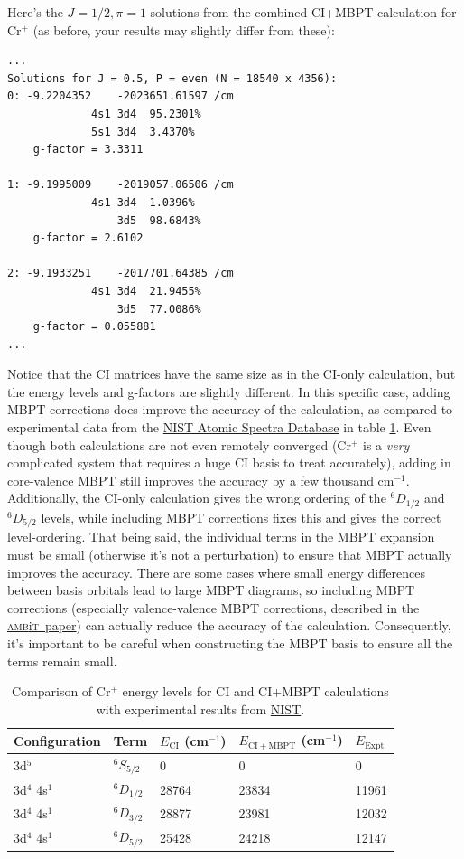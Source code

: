 \documentclass{report}
\newcommand{\ambit}{\textsc{amb}{\footnotesize i}\textsc{t}}
\begin{document}
Here's the $J = 1/2, \pi = 1$ solutions from the combined CI+MBPT calculation for Cr$^+$ (as before, 
your results may slightly differ from these):

\begin{verbatim}
...
Solutions for J = 0.5, P = even (N = 18540 x 4356):
0: -9.2204352    -2023651.61597 /cm
             4s1 3d4  95.2301%
             5s1 3d4  3.4370%
    g-factor = 3.3311

1: -9.1995009    -2019057.06506 /cm
             4s1 3d4  1.0396%
                 3d5  98.6843%
    g-factor = 2.6102

2: -9.1933251    -2017701.64385 /cm
             4s1 3d4  21.9455%
                 3d5  77.0086%
    g-factor = 0.055881
...
\end{verbatim}

Notice that the CI matrices have the same size as in the CI-only calculation, but the energy levels and
g-factors are slightly different. In this specific case, adding MBPT corrections does improve the
accuracy of the calculation, as compared to experimental data from the 
\href{https://physics.nist.gov/PhysRefData/ASD/levels_form.html}{NIST Atomic Spectra Database} in table
\ref{tab:CI_MBPT_comparison}. Even though both calculations are not even remotely converged (Cr$^+$ is a
\emph{very} complicated system that requires a huge CI basis to treat accurately), adding in
core-valence MBPT still improves the accuracy by a few thousand cm$^{-1}$. Additionally,
the CI-only calculation gives the wrong ordering of the $^6D_{1/2}$ and $^6D_{5/2}$
levels, while including MBPT corrections fixes this and gives the correct level-ordering. That being
said, the individual terms in the MBPT expansion must be small (otherwise it's not a perturbation) to
ensure that MBPT actually improves the accuracy. There are some cases where small energy differences
between basis orbitals lead to large MBPT diagrams, so including MBPT corrections (especially
valence-valence MBPT corrections, described in the \href{https://arxiv.org/abs/1805.11265}
{\ambit\ paper}) can
actually reduce the accuracy of the calculation. Consequently, it's important to be careful when 
constructing the MBPT basis to ensure all the terms remain small.

\begin{table}
\label{tab:CI_MBPT_comparison}
\caption{Comparison of Cr$^+$ energy levels for CI and CI+MBPT calculations with experimental results
from \href{https://physics.nist.gov/PhysRefData/ASD/levels_form.html}{NIST}.}
\begin{tabular}{l  l  l  l  l}
\hline
Configuration   &Term    &$E_{\mathrm{CI}}$ (cm$^{-1}$)     &$E_{\mathrm{CI+MBPT}}$ (cm$^{-1}$)  & $E_{\mathrm{Expt}}$\\
\hline
\hline
3d$^5$  &$^6S_{5/2}$    &0  &0  &0\\
3d$^4$ 4s$^1$   &$^6D_{1/2}$    &28764   &23834   &11961\\
3d$^4$ 4s$^1$   &$^6D_{3/2}$    &28877   &23981   &12032\\
3d$^4$ 4s$^1$   &$^6D_{5/2}$    &25428   &24218   &12147\\
\hline
\end{tabular}
\end{table}
\end{document}
